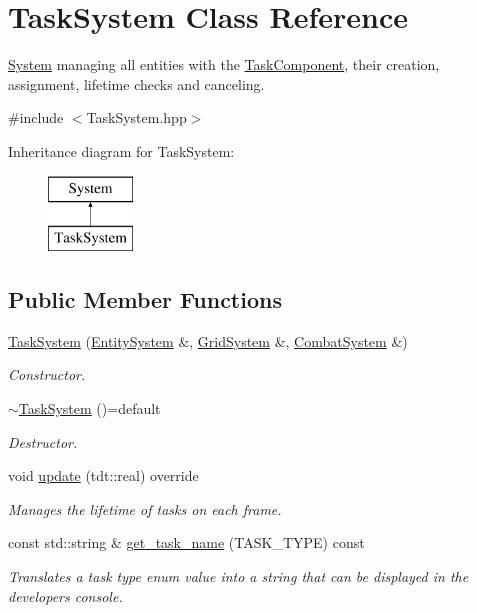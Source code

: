 \hypertarget{class_task_system}{}\section{Task\+System Class Reference}
\label{class_task_system}


\hyperlink{class_system}{System} managing all entities with the \hyperlink{struct_task_component}{Task\+Component}, their creation, assignment, lifetime checks and canceling.  




{\ttfamily \#include $<$Task\+System.\+hpp$>$}

Inheritance diagram for Task\+System\+:\begin{figure}[H]
\begin{center}
\leavevmode
\includegraphics[height=2.000000cm]{class_task_system}
\end{center}
\end{figure}
\subsection*{Public Member Functions}
\begin{DoxyCompactItemize}
\item 
\hyperlink{class_task_system_a07a8d2cbffd5c271f26f4ba5f5398db3}{Task\+System} (\hyperlink{class_entity_system}{Entity\+System} \&, \hyperlink{class_grid_system}{Grid\+System} \&, \hyperlink{class_combat_system}{Combat\+System} \&)
\begin{DoxyCompactList}\small\item\em Constructor. \end{DoxyCompactList}\item 
\hyperlink{class_task_system_aa194a7b7ea57bb7261146a869223893e}{$\sim$\+Task\+System} ()=default
\begin{DoxyCompactList}\small\item\em Destructor. \end{DoxyCompactList}\item 
void \hyperlink{class_task_system_a7dda98e47b288ace9709f0d47a1a66c2}{update} (tdt\+::real) override
\begin{DoxyCompactList}\small\item\em Manages the lifetime of tasks on each frame. \end{DoxyCompactList}\item 
const std\+::string \& \hyperlink{class_task_system_aec5a5f875bd4a6fc78cef6ddb934b8ef}{get\+\_\+task\+\_\+name} (T\+A\+S\+K\+\_\+\+T\+Y\+PE) const 
\begin{DoxyCompactList}\small\item\em Translates a task type enum value into a string that can be displayed in the developer\textquotesingle{}s console. \end{DoxyCompactList}\end{DoxyCompactItemize}
